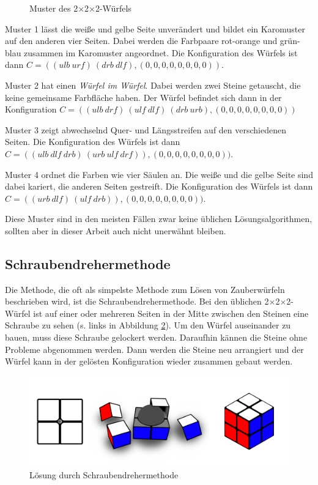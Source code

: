 \documentclass[12pt,a4paper, usenames, dvipsnames]{article}
\theoremstyle{mystyle}
\theoremstyle{definition}
\newcommand{\Ttwo}{2$\times$2$\times$2-}
\begin{document}
\begin{figure}[h]
\caption{Muster des \Ttwo Würfels}
\label{Abbildung_Muster}
\end{figure}

Muster 1 lässt die weiße und gelbe Seite unverändert und bildet ein Karomuster auf den anderen vier Seiten. Dabei werden die Farbpaare rot-orange und grün-blau zusammen im  Karomuster angeordnet. Die Konfiguration des Würfels ist dann $C = ((\textit{ulb} \ \textit{urf} ) \ ( \textit{drb} \ \textit{dlf} ),(0,0,0,0,0,0,0,0))$.

Muster 2 hat einen \textit{Würfel im Würfel}. Dabei werden zwei Steine getauscht, die keine gemeinsame Farbfläche haben. Der Würfel befindet sich dann in der Konfiguration $C = (( ulb \ drf ) \ ( ulf \ dlf ) \ ( drb \ urb ),(0,0,0,0,0,0,0,0))$

Muster 3 zeigt abwechselnd Quer- und Längsstreifen auf den verschiedenen Seiten. Die Konfiguration des Würfels ist dann $C = (( \textit{ulb} \ \textit{dlf} \ \textit{drb} ) \ ( \textit{urb} \ \textit{ulf} \ \textit{drf} )),(0,0,0,0,0,0,0,0))$.

Muster 4 ordnet die Farben wie vier Säulen an. Die weiße und die gelbe Seite sind dabei kariert, die anderen Seiten gestreift. Die Konfiguration des Würfels ist dann $C = ( (\textit{urb} \ \textit{dlf} ) \ ( \textit{ulf} \ \textit{drb}  ) ),(0,0,0,0,0,0,0,0))$.


Diese Muster sind in den meisten Fällen zwar keine üblichen Lösungsalgorithmen, sollten aber in dieser Arbeit auch nicht unerwähnt bleiben.

%
%
%
%
%
%
%
%
%
%
%
%
%
%
%
%
%
%
%
\subsection{Schraubendrehermethode}

Die Methode, die oft als simpelste Methode zum Lösen von Zauberwürfeln beschrieben wird, ist die Schraubendrehermethode.
Bei den üblichen \Ttwo Würfel ist auf einer oder mehreren Seiten in der Mitte zwischen den Steinen eine Schraube zu sehen (s. links in Abbildung \ref{Abbildung_Schraubendrehermethode}).
Um den Würfel auseinander zu bauen, muss diese Schraube gelockert werden. Daraufhin kännen die Steine ohne Probleme abgenommen werden. 
Dann werden die Steine neu arrangiert und der Würfel kann in der gelösten Konfiguration wieder zusammen gebaut werden.

\begin{figure}[H]
\centering
\includegraphics[scale=0.2]{schraube_m.png}
\caption{Lösung durch Schraubendrehermethode}
\label{Abbildung_Schraubendrehermethode}
\end{figure}
\end{document}
